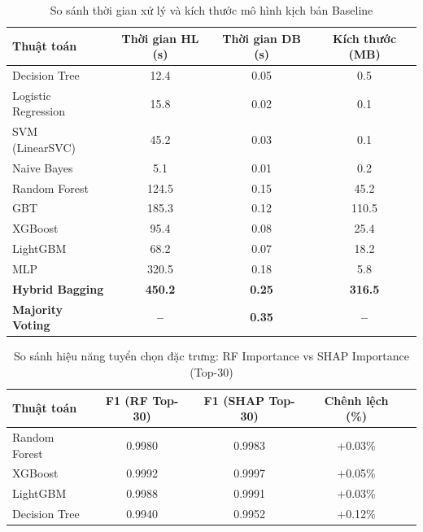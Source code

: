 \begin{table}[htbp]
\centering
\caption{So sánh thời gian xử lý và kích thước mô hình kịch bản Baseline}
\label{tab:exp0_system_performance}
\begin{tabular*}{\textwidth}{@{\extracolsep{\fill}}lccc@{}}
\toprule
\textbf{Thuật toán} & \textbf{Thời gian HL (s)} & \textbf{Thời gian DB (s)} & \textbf{Kích thước (MB)} \\ \midrule
Decision Tree          & 12.4 & 0.05 & 0.5 \\
Logistic Regression    & 15.8 & 0.02 & 0.1 \\
SVM (LinearSVC)        & 45.2 & 0.03 & 0.1 \\
Naive Bayes            & 5.1 & 0.01 & 0.2 \\
Random Forest          & 124.5 & 0.15 & 45.2 \\
GBT                    & 185.3 & 0.12 & 110.5 \\
XGBoost                & 95.4 & 0.08 & 25.4 \\
LightGBM               & 68.2 & 0.07 & 18.2 \\
MLP                    & 320.5 & 0.18 & 5.8 \\ \midrule
\textbf{Hybrid Bagging}   & \textbf{450.2} & \textbf{0.25} & \textbf{316.5} \\
\textbf{Majority Voting}  & \textbf{--} & \textbf{0.35} & \textbf{--} \\ \bottomrule
\end{tabular*}
\end{table}

\begin{table}[htbp]
\centering
\caption{So sánh hiệu năng tuyển chọn đặc trưng: RF Importance vs SHAP Importance (Top-30)}
\label{tab:rf_vs_shap}
\begin{tabular*}{\textwidth}{@{\extracolsep{\fill}}lcccc@{}}
\toprule
\textbf{Thuật toán} & \textbf{F1 (RF Top-30)} & \textbf{F1 (SHAP Top-30)} & \textbf{Chênh lệch (\%)} \\ \midrule
Random Forest & 0.9980 & 0.9983 & +0.03\% \\
XGBoost & 0.9992 & 0.9997 & +0.05\% \\
LightGBM & 0.9988 & 0.9991 & +0.03\% \\
Decision Tree & 0.9940 & 0.9952 & +0.12\% \\ \bottomrule
\end{tabular*}
\end{table}
